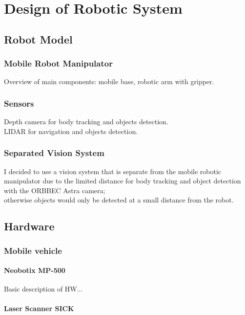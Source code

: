 \chapter{Design of Robotic System}

\section{Robot Model}

\subsection{Mobile Robot Manipulator}
Overview of main components: mobile base, robotic arm with gripper.\\

\subsection{Sensors}
Depth camera for body tracking and objects detection. \\
LIDAR for navigation and objects detection.\\

\subsection{Separated Vision System}
I decided to use a vision system that is separate from the mobile robotic manipulator due to the limited distance for body tracking and object detection with the ORBBEC Astra camera;\\
otherwise objects would only be detected at a small distance from the robot.

\section{Hardware}

\subsection{Mobile vehicle}

\subsubsection{Neobotix MP-500}
Basic description of HW...\\
\subsubsection{Laser Scanner SICK}

